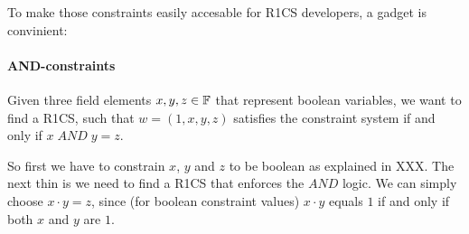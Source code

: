 To make those constraints easily accesable for R1CS developers, a gadget is convinient:

   

\paragraph{AND-constraints} Given three field elements $x,y,z\in\mathbb{F}$ that represent boolean variables, we want to find a R1CS, such that $w=(1,x,y,z)$ satisfies the constraint system if and only if $x\; AND \; y =z$. 

So first we have to constrain $x$, $y$ and $z$ to be boolean as explained in XXX. The next thin is we need to find a R1CS that enforces the $AND$ logic. We can simply choose $x\cdot y =z$, since (for boolean constraint values) $x\cdot y$ equals $1$ if and only if both $x$ and $y$ are $1$.  

